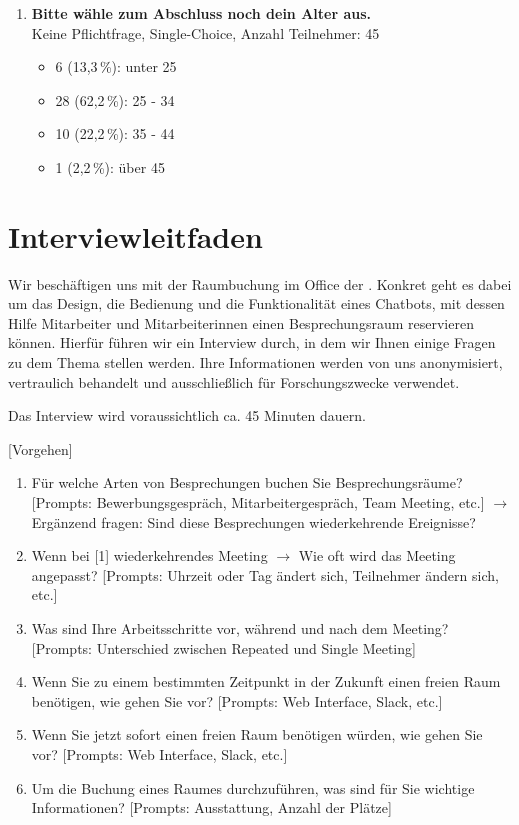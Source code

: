 \begin{enumerate}
    \item \textbf{Bitte wähle zum Abschluss noch dein Alter aus.} \\ 
    Keine Pflichtfrage, Single-Choice, Anzahl Teilnehmer: 45
    \begin{itemize}
        \item[] 6 (13,3\,\%): unter 25
        \item[] 28 (62,2\,\%): 25 - 34
        \item[] 10 (22,2\,\%): 35 - 44 
        \item[] 1 (2,2\,\%): über 45
    \end{itemize}
    
\end{enumerate}

\clearpage
\section{Interviewleitfaden}
\label{sec:anhang-interviewleitfaden}

Wir beschäftigen uns mit der Raumbuchung im Office der \adorsys{}. Konkret geht es dabei um das Design, die Bedienung und die Funktionalität eines Chatbots, mit dessen Hilfe Mitarbeiter und Mitarbeiterinnen einen Besprechungsraum reservieren können. Hierfür führen wir ein Interview durch, in dem wir Ihnen einige Fragen zu dem Thema stellen werden. 
Ihre Informationen werden von uns anonymisiert, vertraulich behandelt und ausschließlich für Forschungszwecke verwendet. 

Das Interview wird voraussichtlich ca. 45 Minuten dauern.

[Vorgehen]

\begin{enumerate}

    \item Für welche Arten von Besprechungen buchen Sie Besprechungsräume? [Prompts: Bewerbungsgespräch, Mitarbeitergespräch, Team Meeting, etc.] $\rightarrow$ Ergänzend fragen: Sind diese Besprechungen wiederkehrende Ereignisse?
    
    \item Wenn bei [1] wiederkehrendes Meeting $\rightarrow$ Wie oft wird das Meeting angepasst? [Prompts: Uhrzeit oder Tag ändert sich, Teilnehmer ändern sich, etc.]
    
    \item Was sind Ihre Arbeitsschritte vor, während und nach dem Meeting? [Prompts: Unterschied zwischen Repeated und Single Meeting]
    
    \item Wenn Sie zu einem bestimmten Zeitpunkt in der Zukunft einen freien Raum benötigen, wie gehen Sie vor? [Prompts: Web Interface, Slack, etc.]
    
    \item Wenn Sie jetzt sofort einen freien Raum benötigen würden, wie gehen Sie vor? [Prompts: Web Interface, Slack, etc.]
    
    \item Um die Buchung eines Raumes durchzuführen, was sind für Sie wichtige Informationen? [Prompts: Ausstattung, Anzahl der Plätze]

\end{enumerate}

